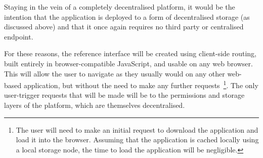 Staying in the vein of a completely decentralised platform, it would be the intention that the application is deployed to a form of decentralised storage (as discussed above) and that it once again requires no third party or centralised endpoint.

For these reasons, the reference interface will be created using client-side routing, built entirely in browser-compatible JavaScript, and usable on any web browser. This will allow the user to navigate as they usually would on any other web-based application, but without the need to make any further requests~\footnote{The user will need to make an initial request to download the application and load it into the browser. Assuming that the application is cached locally using a local storage node, the time to load the application will be negligible.}. The only user-trigger requests that will be made will be to the permissions and storage layers of the platform, which are themselves decentralised.

